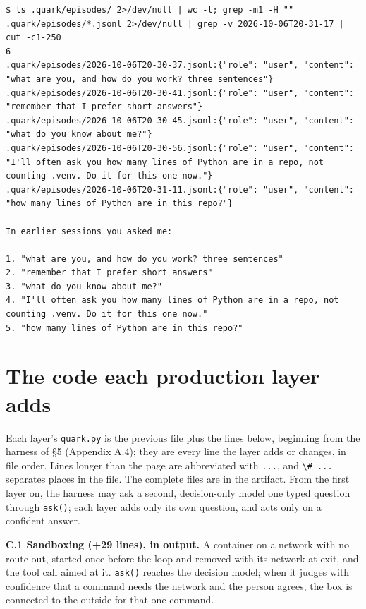 \begin{lstlisting}
$ ls .quark/episodes/ 2>/dev/null | wc -l; grep -m1 -H "" .quark/episodes/*.jsonl 2>/dev/null | grep -v 2026-10-06T20-31-17 | cut -c1-250
6
.quark/episodes/2026-10-06T20-30-37.jsonl:{"role": "user", "content": "what are you, and how do you work? three sentences"}
.quark/episodes/2026-10-06T20-30-41.jsonl:{"role": "user", "content": "remember that I prefer short answers"}
.quark/episodes/2026-10-06T20-30-45.jsonl:{"role": "user", "content": "what do you know about me?"}
.quark/episodes/2026-10-06T20-30-56.jsonl:{"role": "user", "content": "I'll often ask you how many lines of Python are in a repo, not counting .venv. Do it for this one now."}
.quark/episodes/2026-10-06T20-31-11.jsonl:{"role": "user", "content": "how many lines of Python are in this repo?"}

In earlier sessions you asked me:

1. "what are you, and how do you work? three sentences"
2. "remember that I prefer short answers"
3. "what do you know about me?"
4. "I'll often ask you how many lines of Python are in a repo, not counting .venv. Do it for this one now."
5. "how many lines of Python are in this repo?"
\end{lstlisting}

\section{The code each production layer adds}

Each layer's \passthrough{\lstinline!quark.py!} is the previous file plus the lines below, beginning from the harness of §5 (Appendix A.4); they are every line the layer adds or changes, in file order. Lines longer than the page are abbreviated with \passthrough{\lstinline!...!}, and \passthrough{\lstinline!\# ...!} separates places in the file. The complete files are in the artifact. From the first layer on, the harness may ask a second, decision-only model \cite{typesafe} one typed question through \passthrough{\lstinline!ask()!}; each layer adds only its own question, and acts only on a confident answer.

\textbf{C.1 Sandboxing (+29 lines), in output.} A container on a network with no route out, started once before the loop and removed with its network at exit, and the tool call aimed at it. \passthrough{\lstinline!ask()!} reaches the decision model; when it judges with confidence that a command needs the network and the person agrees, the box is connected to the outside for that one command.

